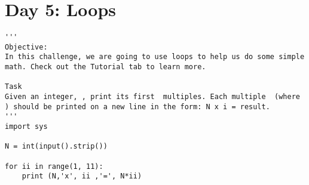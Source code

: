 \documentclass[11pt,a4paper]{article}
\begin{document}
\newpage
\section{Day 5: Loops}
\begin{lstlisting}
'''
Objective: 
In this challenge, we are going to use loops to help us do some simple math. Check out the Tutorial tab to learn more.

Task 
Given an integer, , print its first  multiples. Each multiple  (where ) should be printed on a new line in the form: N x i = result.
'''
import sys

N = int(input().strip())

for ii in range(1, 11):
    print (N,'x', ii ,'=', N*ii)

\end{lstlisting}
\end{document}
